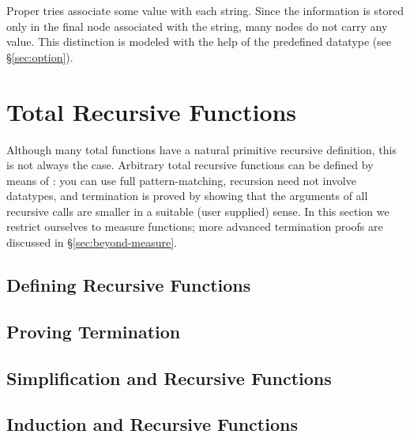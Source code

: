 Proper tries associate some value with each string. Since the
information is stored only in the final node associated with the string, many
nodes do not carry any value. This distinction is modeled with the help
of the predefined datatype  (see {\S}\ref{sec:option}).


\section{Total Recursive Functions}
\label{sec:recdef}

Although many total functions have a natural primitive recursive definition,
this is not always the case. Arbitrary total recursive functions can be
defined by means of : you can use full pattern-matching,
recursion need not involve datatypes, and termination is proved by showing
that the arguments of all recursive calls are smaller in a suitable (user
supplied) sense. In this section we restrict ourselves to measure functions;
more advanced termination proofs are discussed in {\S}\ref{sec:beyond-measure}.

\subsection{Defining Recursive Functions}
\label{sec:recdef-examples}


\subsection{Proving Termination}


\subsection{Simplification and Recursive Functions}
\label{sec:recdef-simplification}


\subsection{Induction and Recursive Functions}


\label{sec:recdef-induction}


